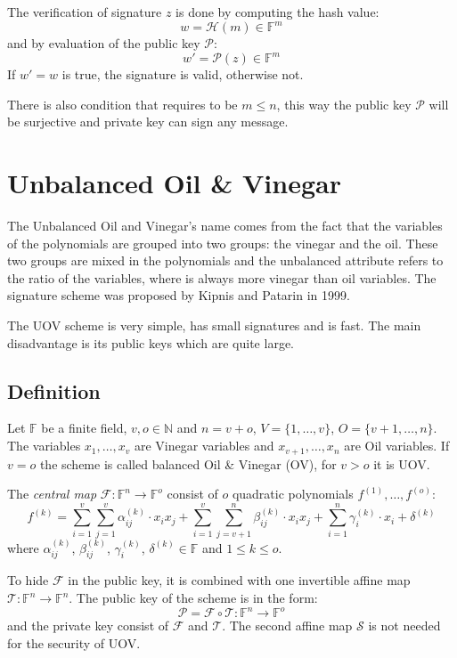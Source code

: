 \documentclass[thesis=M,english]{FITthesis}[2019/12/23]
\begin{document}
The verification of signature $z$ is done by computing the hash value:
\[
	w = \mathcal{H}(m) \in \mathbb{F}^m
\]
and by evaluation of the public key $\mathcal{P}$:
\[
	w' = \mathcal{P}(z) \in \mathbb{F}^m
\]
If $w' = w$ is true, the signature is valid, otherwise not.

There is also condition that requires to be $m \leq n$, this way the public key $\mathcal{P}$ will be surjective and private key can sign any message.

\section{Unbalanced Oil \& Vinegar}
The Unbalanced Oil and Vinegar's name comes from the fact that the variables of the polynomials are grouped into two groups: the vinegar and the oil. These two groups are mixed in the polynomials and the unbalanced attribute refers to the ratio of the variables, where is always more vinegar than oil variables. The signature scheme was proposed by Kipnis and Patarin in 1999.

\bigskip
\noindent
The UOV scheme is very simple, has small signatures and is fast. The main disadvantage is its public keys which are quite large.

\subsection{Definition}
Let $\mathbb{F}$ be a finite field, $v,o \in \mathbb{N}$ and $n=v+o$, $V=\{1, \ldots, v\}$, $O=\{v+1, \ldots, n\}$. The variables $x_1, \ldots, x_v$ are Vinegar variables and $x_{v+1}, \ldots, x_n$ are Oil variables. If $v=o$ the scheme is called balanced Oil \& Vinegar (OV), for $v>o$ it is UOV.

\bigskip
\noindent
The \textit{central map} $\mathcal{F}:\mathbb{F}^n \rightarrow \mathbb{F}^o$ consist of $o$ quadratic polynomials $f^{(1)}, \ldots, f^{(o)}$:
\[
	f^{(k)} = \sum\limits_{i=1}^{v} {\sum\limits_{j=1}^{v} {\alpha_{ij}^{(k)} \cdot x_ix_j}} +  \sum\limits_{i=1}^{v} {\sum\limits_{j=v+1}^{n} {\beta_{ij}^{(k)} \cdot x_ix_j}}+ \sum\limits_{i=1}^{n} {\gamma_{i}^{(k)} \cdot x_i} + \delta^{(k)}
\]
where $\alpha_{ij}^{(k)}$, $\beta_{ij}^{(k)}$, $\gamma_{i}^{(k)}$, $\delta^{(k)} \in \mathbb{F}$ and $1 \leq k \leq o$.

\bigskip
\noindent
To hide $\mathcal{F}$ in the public key, it is combined with one invertible affine map $\mathcal{T}: \mathbb{F}^n \rightarrow \mathbb{F}^n$. The public key of the scheme is in the form:
\[
	\mathcal{P} = \mathcal{F} \circ \mathcal{T} : \mathbb{F}^n \rightarrow \mathbb{F}^o
\]
and the private key consist of $\mathcal{F}$ and $\mathcal{T}$. The second affine map $\mathcal{S}$ is not needed for the security of UOV.
\end{document}
